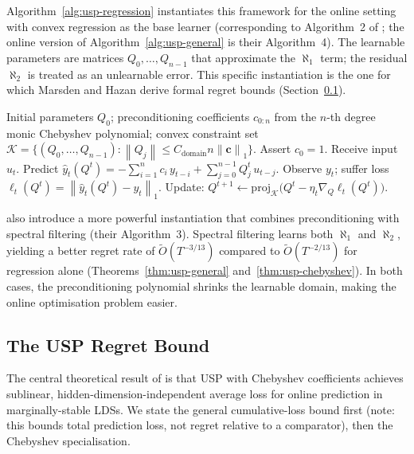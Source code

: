 \documentclass[11pt]{article}
\theoremstyle{plain}
\theoremstyle{definition}
\theoremstyle{remark}
\newcommand{\norm}[1]{\left\lVert#1\right\rVert}
\begin{document}
Algorithm~\ref{alg:usp-regression} instantiates this framework for the online setting with convex regression as the base learner (corresponding to Algorithm~2 of \citet{marsden2024universal}; the online version of Algorithm~\ref{alg:usp-general} is their Algorithm~4). The learnable parameters are matrices $Q_0, \ldots, Q_{n-1}$ that approximate the $\aleph_1$ term; the residual $\aleph_2$ is treated as an unlearnable error. This specific instantiation is the one for which Marsden and Hazan derive formal regret bounds (Section~\ref{sec:usp-regret}).

\begin{algorithm}[t]
\caption{USP for Regression \citep[Alg.~2]{marsden2024universal}}
\label{alg:usp-regression}
\begin{algorithmic}[1]
\REQUIRE Initial parameters $Q_0$; preconditioning coefficients $c_{0:n}$ from the $n$-th degree monic Chebyshev polynomial; convex constraint set $\mathcal{K} = \{(Q_0, \ldots, Q_{n-1}) : \norm{Q_j} \leq C_{\mathrm{domain}} n \norm{\boldsymbol{c}}_1\}$.
\STATE Assert $c_0 = 1$.
    \STATE Receive input $u_t$.
    \STATE Predict $\hat y_t(Q^t) = -\sum_{i=1}^{n} c_i\, y_{t-i} + \sum_{j=0}^{n-1} Q_j^t\, u_{t-j}$.
    \STATE Observe $y_t$; suffer loss $\ell_t(Q^t) = \norm{\hat y_t(Q^t) - y_t}_1$.
    \STATE Update: $Q^{t+1} \leftarrow \mathrm{proj}_{\mathcal{K}}\!\bigl(Q^t - \eta_t \nabla_Q \ell_t(Q^t)\bigr)$.
\ENDFOR
\end{algorithmic}
\end{algorithm}

\citet{marsden2024universal} also introduce a more powerful instantiation that combines preconditioning with spectral filtering (their Algorithm~3). Spectral filtering learns both $\aleph_1$ and $\aleph_2$, yielding a better regret rate of $\tilde O(T^{-3/13})$ compared to $\tilde O(T^{-2/13})$ for regression alone (Theorems~\ref{thm:usp-general} and~\ref{thm:usp-chebyshev}). In both cases, the preconditioning polynomial shrinks the learnable domain, making the online optimisation problem easier.

\subsection{The USP Regret Bound}
\label{sec:usp-regret}

The central theoretical result of \citet{marsden2024universal} is that USP with Chebyshev coefficients achieves sublinear, hidden-dimension-independent average loss for online prediction in marginally-stable LDSs. We state the general cumulative-loss bound first (note: this bounds total prediction loss, not regret relative to a comparator), then the Chebyshev specialisation.
\end{document}
